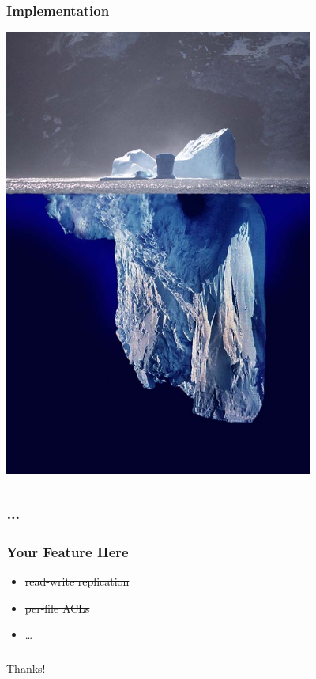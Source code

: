 \documentclass{beamer}
\begin{document}
\begin{frame}
\frametitle{Implementation}
\includegraphics[width=4in]{iceberg}
\end{frame}

\subsection{\ldots}

\begin{frame}
\frametitle{Your Feature Here}
\begin{itemize}
\item{\sout{read-write replication}}
\item{\sout{per-file ACLs}}
\item{\ldots}
\end{itemize}
\end{frame}

\begin{frame}
\frametitle{}
\Large{Thanks!}
\end{frame}
\end{document}
